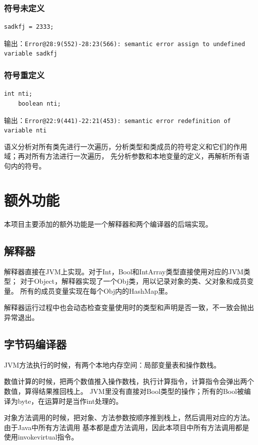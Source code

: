 \documentclass[a4paper]{article}
\begin{document}
\subsubsection{符号未定义}
\begin{lstlisting}[style=minijava]
    sadkfj = 2333;
\end{lstlisting} \par
输出：{\tt Error@28:9(552)-28:23(566): semantic error assign to undefined variable sadkfj}
\subsubsection{符号重定义}
\begin{lstlisting}[style=minijava]
    int nti;
    boolean nti;
\end{lstlisting} \par
输出：{\tt Error@22:9(441)-22:21(453): semantic error redefinition of variable nti}
\par
语义分析对所有类先进行一次遍历，分析类型和类成员的符号定义和它们的作用域；再对所有方法进行一次遍历，
先分析参数和本地变量的定义，再解析所有语句内的符号。

\section{额外功能}
本项目主要添加的额外功能是一个解释器和两个编译器的后端实现。

\subsection{解释器}
解释器直接在JVM上实现。对于Int，Bool和IntArray类型直接使用对应的JVM类型；
对于Object，解释器实现了一个Obj类，用以记录对象的类、父对象和成员变量。
所有的成员变量实现在每个Obj内的HashMap里。

解释器运行过程中也会动态检查变量使用时的类型和声明是否一致，不一致会抛出异常退出。

\subsection{字节码编译器}
JVM方法执行的时候，有两个本地内存空间：局部变量表和操作数栈。

数值计算的时候，把两个数值推入操作数栈，执行计算指令，计算指令会弹出两个数值，算得结果推回栈上。
JVM里没有直接对Bool类型的操作；所有的Bool被编译为byte，在运算时是当作int处理的。

对象方法调用的时候，把对象、方法参数按顺序推到栈上，然后调用对应的方法。由于Java中所有方法调用
基本都是虚方法调用，因此本项目中所有方法调用都是使用invokevirtual指令。
\end{document}
